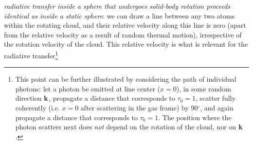 {\it radiative transfer inside a sphere that undergoes solid-body
rotation proceeds identical as inside a static sphere}: we can draw
a line between any two atoms within the rotating cloud, and their
relative velocity along this line is zero (apart from the relative
velocity as a result of random thermal motion), irrespective of the
rotation velocity of the cloud. This relative velocity is what is
relevant for the radiative transfer\footnote{This point can be further
illustrated by considering the path of individual photons: let a
photon be emitted at line center ($x=0$), in some random direction
${\bf k}$, propagate a distance that corresponds to $\tau_0=1$,
scatter fully coherently (i.e. $x=0$ after scattering in the gas
frame) by 90$^{\circ}$, and again propagate a distance that
corresponds to $\tau_0=1$. The position where the photon scatters
next does {\it not} depend on the rotation of the cloud, nor on
${\bf k}$.}
